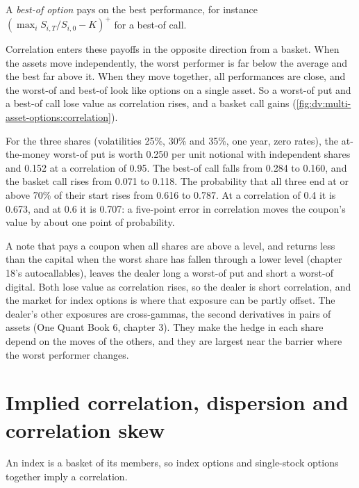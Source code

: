\begin{definition}\label{def:dv:multi-asset-options:bestof}
A \emph{best-of option} pays on the best performance, for instance
$(\max_iS_{i,T}/S_{i,0}-K)^+$ for a best-of call.
\end{definition}

Correlation enters these payoffs in the opposite direction from a basket. When the assets move independently, the
worst performer is far below the average and the best far above it. When they move together, all performances are
close, and the worst-of and best-of look like options on a single asset. So a worst-of put and a best-of call lose
value as correlation rises, and a basket call gains
(\cref{fig:dv:multi-asset-options:correlation}).

\begin{example}\label{ex:dv:multi-asset-options:three}
For the three shares (volatilities 25\%, 30\% and 35\%, one year, zero rates), the at-the-money worst-of put is worth
0.250 per unit notional with independent shares and 0.152 at a correlation of 0.95. The best-of call falls from 0.284 to
0.160, and the basket call rises from 0.071 to 0.118. The probability that all three end at or above 70\% of their start
rises from 0.616 to 0.787. At a correlation of 0.4 it is 0.673, and at 0.6 it is 0.707: a five-point error in
correlation moves the coupon's value by about one point of probability.
\end{example}

A note that pays a coupon when all shares are above a level, and returns less than the capital when the worst share has
fallen through a lower level (chapter 18's autocallables), leaves the dealer long a worst-of put and short a worst-of
digital. Both lose value as correlation rises, so the dealer is short correlation, and the market for index options is
where that exposure can be partly offset. The dealer's other exposures are cross-gammas, the second derivatives in
pairs of assets (One Quant Book 6, chapter 3). They make the hedge in each share depend on the moves of the others, and
they are largest near the barrier where the worst performer changes.

\section{Implied correlation, dispersion and correlation skew}

An index is a basket of its members, so index options and single-stock options together imply a correlation.

